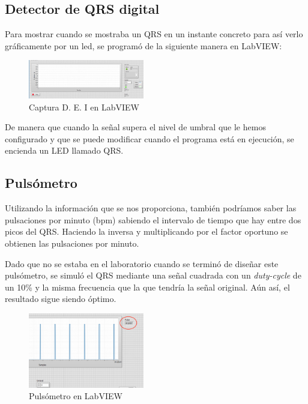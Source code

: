 \documentclass[conference]{IEEEtran}
\begin{document}
\subsection{Detector de QRS digital}
Para mostrar cuando se mostraba un QRS en un instante concreto para así verlo gráficamente por un led, se programó de la siguiente manera en LabVIEW:
\begin{figure}[H]
    \centerline{\includegraphics[width=0.45\textwidth]{e_captura.png}}
    \caption{Captura D. E. I en LabVIEW}
    \end{figure}

De manera que cuando la señal supera el nivel de umbral que le hemos configurado y que se puede modificar cuando el programa está en ejecución, se encienda un LED llamado QRS.

\subsection{Pulsómetro}
Utilizando la información que se nos proporciona, también podríamos saber las pulsaciones por minuto (bpm) sabiendo el intervalo de tiempo que hay entre dos picos del QRS. Haciendo la inversa y multiplicando por el factor oportuno se obtienen las pulsaciones por minuto.

Dado que no se estaba en el laboratorio cuando se terminó de diseñar este pulsómetro, se simuló el QRS mediante una señal cuadrada con un \textit{duty-cycle} de un 10\% y la misma frecuencia que la que tendría la señal original. Aún así, el resultado sigue siendo óptimo.
\begin{figure}[H]
    \centerline{\includegraphics[width=0.45\textwidth]{e_pulsometro.png}}
    \caption{Pulsómetro en LabVIEW}
    \end{figure}
\end{document}
